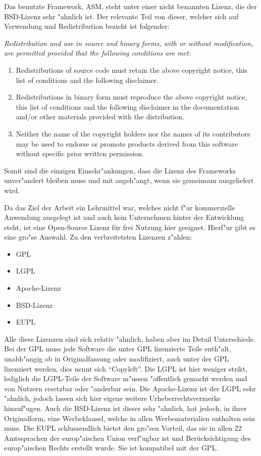 Das benutzte Framework, ASM, steht unter einer nicht benannten Lizenz, die der BSD-Lizenz sehr "ahnlich ist. Der relevante Teil von dieser, welcher sich auf Verwendung und Redistribution bezieht ist folgender:

{\itshape
Redistribution and use in source and binary forms, with or without
modification, are permitted provided that the following conditions
are met:

\begin{enumerate}
	\item Redistributions of source code must retain the above copyright notice, this list of conditions and the following disclaimer.
	\item Redistributions in binary form must reproduce the above copyright notice, this list of conditions and the following disclaimer in the documentation and/or other materials provided with the distribution.
	\item Neither the name of the copyright holders nor the names of its contributors may be used to endorse or promote products derived from this software without specific prior written permission.
\end{enumerate}
}
\cite{asm_license}

Somit sind die einzigen Einschr"ankungen, dass die Lizenz des Frameworks unver"andert bleiben muss und mit angeh"angt, wenn sie gemeinsam ausgeliefert wird.

Da das Ziel der Arbeit ein Lehrmittel war, welches nicht f"ur kommerzielle Anwendung ausgelegt ist und auch kein Unternehmen hinter der Entwicklung steht, ist eine Open-Source Lizenz für frei Nutzung hier geeignet. Hierf"ur gibt es eine gro"se Auswahl. Zu den verbreitetsten Lizenzen z"ahlen:

\begin{itemize}
	\item \ac{GPL}
	\item \ac{LGPL}
	\item Apache-Lizenz
	\item \ac{BSD}-Lizenz
	\item \ac{EUPL}
\end{itemize}

Alle diese Lizenzen sind sich relativ "ahnlich, haben aber im Detail Unterschiede.
Bei der \ac{GPL} muss jede Software die unter GPL lizenzierte Teile enth"alt, unabh"angig ob in Originalfassung oder modifiziert, auch unter der \ac{GPL} lizenziert werden, dies nennt sich "`Copyleft"'. \cite{gpl_wiki}
Die \ac{LGPL} ist hier weniger strikt, lediglich die \ac{LGPL}-Teile der Software m"ussen "offentlich gemacht werden und von Nutzern ersetzbar oder "anderbar sein. \cite{lgpl_wiki}
Die Apache-Lizenz ist der \ac{LGPL} sehr "ahnlich, jedoch lassen sich hier eigene weitere Urheberrechtsvermerke hinzuf"ugen. \cite{apache_wiki}
Auch die \ac{BSD}-Lizenz ist dieser sehr "ahnlich, hat jedoch, in ihrer Originalform, eine Werbeklausel, welche in allen Werbematerialien enthalten sein muss. \cite{bsd_wiki}
Die \ac{EUPL} schlussendlich bietet den gro"sen Vorteil, das sie in allen 22 Amtssprachen der europ"aischen Union verf"ugbar ist und Berücksichtigung des europ"aischen Rechts erstellt wurde. Sie ist kompatibel mit der \ac{GPL}. \cite{eupl_wiki}

